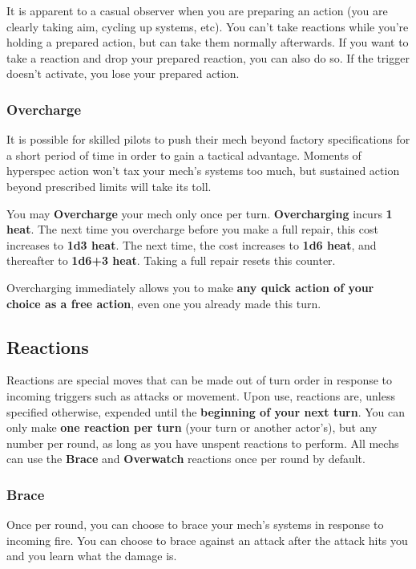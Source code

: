 It is apparent to a casual observer when you are preparing an action (you are clearly taking aim, cycling up systems, etc). You can’t take reactions while you’re holding a prepared action, but can take them normally afterwards. If you want to take a reaction and drop your prepared reaction, you can also do so. If the trigger doesn’t activate, you lose your prepared action.


\subsubsection{Overcharge}
It is possible for skilled pilots to push their mech beyond factory specifications for a short period of time in order to gain a tactical advantage. Moments of hyperspec action won't tax your mech's systems too much, but sustained action beyond prescribed limits will take its toll. 

You may \textbf{Overcharge} your mech only once per turn. \textbf{Overcharging} incurs \textbf{1 heat}. The next time you overcharge before you make a full repair, this cost increases to \textbf{1d3 heat}. The next time, the cost increases to \textbf{1d6 heat}, and thereafter to \textbf{1d6+3 heat}. Taking a full repair resets this counter.

Overcharging immediately allows you to make \textbf{any quick action of your choice as a free action}, even one you already made this turn.


\subsection{Reactions}
Reactions are special moves that can be made out of turn order in response to incoming triggers such as attacks or movement. Upon use, reactions are, unless specified otherwise, expended until the \textbf{beginning of your next turn}. You can only make \textbf{one reaction per turn} (your turn or another actor’s), but any number per round, as long as you have unspent reactions to perform. All mechs can use the \textbf{Brace} and \textbf{Overwatch} reactions once per round by default.

\subsubsection{Brace}
Once per round, you can choose to brace your mech’s systems in response to incoming fire. You can choose to brace against an attack after the attack hits you and you learn what the damage is.

